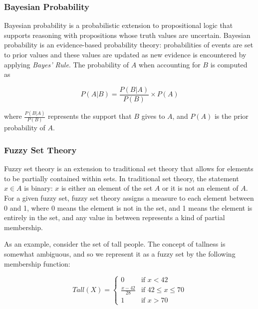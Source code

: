 \documentclass[thesis.tex]{subfiles}
\begin{document}
\subsubsection{Bayesian Probability}

%
%

%
%

Bayesian probability is a probabilistic extension to propositional logic that
supports reasoning with propositions whose truth values are uncertain. Bayesian
probability is an evidence-based probability theory: probabilities of events are set
to prior values and these values are updated as new evidence is encountered
by applying \emph{Bayes' Rule}. The probability of $A$ when accounting for $B$ is
computed as

$$
P(A | B) = \frac{P(B | A)}{P(B)} \times P(A)
$$

where $\frac{P(B | A)}{P(B)}$ represents the support that $B$ gives to $A$, and
$P(A)$ is the prior probability of $A$.





\subsubsection{Fuzzy Set Theory}

%
%

Fuzzy set theory is an extension to traditional set theory that allows for
elements to be partially contained within sets. In traditional set theory,
the statement $x \in A$ is binary: $x$ is either an element of the set $A$ or
it is not an element of $A$. For a given fuzzy set, fuzzy set theory assigns
a measure to each element between 0 and 1, where 0 means the element is not
in the set, and 1 means the element is entirely in the set, and any value in
between represents a kind of partial membership.

As an example, consider the set of tall people. The concept of tallness is
somewhat ambiguous, and so we represent it as a fuzzy set by the following
membership function:

$$
Tall(X) = \begin{cases}
  0                 & \mbox{if } x < 42 \\
  \frac{x - 42}{28} & \mbox{if } 42 \leq x \leq 70 \\
  1                 & \mbox{if } x > 70
\end{cases}
$$
\end{document}
